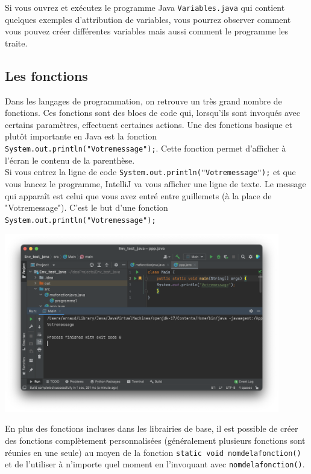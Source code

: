 Si vous ouvrez et exécutez le programme Java \lstinline{Variables.java} qui contient quelques exemples d'attribution de variables, vous pourrez observer comment vous pouvez créer différentes variables mais aussi comment le programme les traite.

\subsection{Les fonctions}

Dans les langages de programmation, on retrouve un très grand nombre de fonctions. Ces fonctions sont des blocs de code qui, lorsqu'ils sont invoqués avec certains paramètres, effectuent certaines actions. Une des fonctions basique et plutôt importante en Java est la fonction \lstinline{System.out.println("Votremessage");}.  Cette fonction permet d'afficher à l'écran le contenu de la parenthèse.\\ 
Si vous entrez la ligne de code \lstinline{System.out.println("Votremessage");} et que vous lancez le programme, IntelliJ va vous afficher une ligne de texte. Le message qui apparaît est celui que vous avez entré entre guillemets (à la place de "Votremessage"). C'est le but d'une fonction \lstinline{System.out.println("Votremessage");}
\begin{center}
\includegraphics[width=12cm]{print}	
\end{center}


En plus des fonctions incluses dans les librairies de base, il est possible de créer des fonctions complètement personnalisées (généralement plusieurs fonctions sont réunies en une seule) au moyen de la fonction \lstinline{static void nomdelafonction() } et de l'utiliser à n'importe quel moment en l'invoquant avec \lstinline{nomdelafonction()}.


